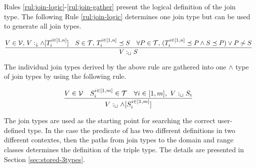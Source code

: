 \documentclass[runningheads]{llncs}
\newcommand{\darr}{\downarrow}
\newcommand{\Darr}{\Downarrow}
\newcommand{\vdasharr}{%
    \mathrel{%
        \vdash\hspace*{-5pt}%
        \raisebox{2.3pt}{\scalebox{.5}{\(\blacktriangleright\)}}%
    }%
}\newcommand{\D}{{\Delta}}
\newcommand{\V}{{\cal V}}
\newcommand{\T}{{\cal T}}
\newcommand{\memo}[1]{}
\begin{document}
Rules \ref{rul:join-logic}-\ref{rul:join-gather} present the logical
definition of the join type. The following Rule \ref{rul:join-logic}
determines one join type but can be used to generate all join types.

\begin{equation}
\label{rul:join-logic}
\dfrac{V\in\V,\, \/V:_\darr\land[T_i^{i\in[1,n]}]\quad\/S\in\T,\, T_i^{i\in[1,n]}\preceq\/S\quad\forall\/P\in\T,\, (T_i^{i\in[1,n]}\preceq\/P\land\/S\preceq\/P)\lor\/P\not\sim\/S}
      {V:_\sqcup\/S}
\end{equation}

The individual join types derived by the above rule are gathered
into one $\land$ type of join types by using the following rule.

\begin{equation}
\label{rul:join-gather}
\dfrac{V\in\V\quad\/S_i^{i\in[1,m]}\in\T\quad\forall\/i\in[1,m],\ V:_\sqcup\/S_i}
{V:_{\sqcup}\land[S_i^{i\in[1,m]}]}
\end{equation}

The join types are used as the starting point for searching the
correct user-defined type. In the case the predicate of has two
different definitions in two different contextes, then the paths from
join types to the domain and range classes determines the definition
of the triple type. The details are presented in Section
\ref{sec:stored-3types}.



\memo{
The rule for filtering $\land[T_i^{i\in[1,n]}]$ of all
$T_i\succeq\/T_j$ where $i\not=j$ by using algorithmic typing is
defined as follows. The algorithm implementing the operation MIN is
presented in Section \ref{sec:alg-MIN}.

\begin{equation}
\label{rul:alg-min}
\dfrac{V\in\V\quad\vdasharr\/V:_\darr\land[T_i^{i\in[1,n]}]\quad\vdasharr\/\{S_j^{j\in[1,m}\}=\,\Darr\kern -3pt[T_i^{i\in[1,n]}]}
{\vdasharr\/V:_{\Darr}\land\/[S_j^{j\in[1,m]}]}
\end{equation}}

\memo{
The following Rule \ref{rul:join-alg} derives the complete join type
in one step. The operator join $\sqcup[T_i^{i\in[1,n]}]$ returns as a
result a set of minimal upper bound types of $T_i^{i\in[1,n]}$. Since
all the join types are valid types of $V$, we can group them into one
$\land$ type.

\begin{equation}
\label{rul:join-alg} 
\dfrac{V\in\V\quad\vdasharr\/V:_\darr\land[T_i^{i\in[1,n]}]\quad\/\vdasharr\{S_j^{j\in[1,m]}\}=\sqcup[T_i^{i\in[1,n]}]}
      {\vdasharr\/V:_\sqcup\land[S_j^{j\in[1,m]}]}
\end{equation}}
\end{document}

